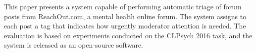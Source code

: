 This paper presents a system capable of performing automatic triage of forum posts from ReachOut.com, a mental health online forum. The system assigns to each post a tag that indicates how urgently moderator attention is needed. The evaluation is based on experiments conducted on the CLPsych 2016 task, and the system is released as an open-source software.
